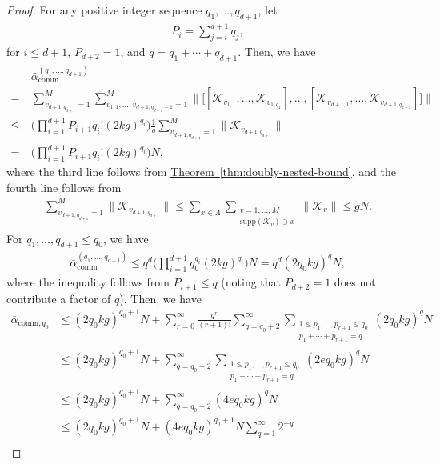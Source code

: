\documentclass[aps,pra,reprint,groupedaddress,floatfix]{revtex4-2}
\newcommand{\thm}[1]{\hyperref[thm:#1]{Theorem~\ref*{thm:#1}}}
\renewcommand{\comm}{\mathrm{comm}}
\newcommand{\supp}{\mathrm{supp}}
\newcommand{\mc}{\mathcal}
\begin{document}
\begin{proof} 
    For any positive integer sequence $q_1, \ldots, q_{d+1}$, let 
    \begin{align*}
        P_{i} = \sum_{j=i}^{d+1} q_j,
    \end{align*}
    for $i\le d+1$, $P_{d+2} = 1$, and $q = q_1+\cdots+q_{d+1}$. Then, we have 
    \begin{align*}
    &\bar{\alpha}_{\comm}^{(q_1, \ldots, q_{d+1})}\\
    =~& \sum_{v_{d+1, q_{d+1}}=1}^{M} \sum_{v_{1,1}, \ldots, v_{d+1, q_{d+1}-1} = 1}^M \bigg\| \Big[ 
         [\mc K_{v_{1,1}}, \ldots, \mc K_{v_{1,q_1}}], \ldots, 
        [\mc K_{v_{d+1,1}}, \ldots, \mc K_{v_{d+1,q_{d+1}}}]
     \Big] \bigg\| \\
    \le~& \bigg(\prod_{i=1}^{d+1}P_{i+1}q_i!(2kg)^{q_i }\bigg)\frac{1}{g}\sum_{v_{d+1, q_{d+1}}=1}^{M} \|\mc K_{v_{d+1, q_{d+1}}}\|\\
    =~&  \bigg(\prod_{i=1}^{d+1}P_{i+1}q_i!(2kg)^{q_i }\bigg)N,
\end{align*}
where the third line follows from \thm{doubly-nested-bound}, and the fourth line follows from 
\begin{align*}
    \sum_{v_{d+1,q_{d+1}}=1}^{M}\|\mc K_{v_{d+1, q_{d+1}}}\|\le \sum_{x\in\Lambda}\sum_{\substack{v = 1, \ldots, M \\ \supp(\mc K_v)\ni x}} \|\mc K_{v}\|\le gN.
\end{align*}
For $q_1, \ldots, q_{d+1}\le q_0$, we have 
\begin{align*}
    \bar{\alpha}_{\comm}^{(q_1, \ldots, q_{d+1})}\le q^{d}\bigg(\prod_{i=1}^{d+1}q_0^{q_{i}}(2kg)^{q_i }\bigg)N = q^{d} (2q_0kg)^q N,
\end{align*}
where the inequality follows from $P_{i+1}\le q$ (noting that $P_{d+2} = 1$ does not contribute a factor of $q$). 
Then, we have 
\begin{align*}
    \bar{\alpha}_{\comm,q_0} &\le (2q_0 kg)^{q_0+1} N+ \sum_{r = 0}^{\infty}\frac{q^{r} }{(r+1)!} \sum_{q=q_0+2}^{\infty}\sum_{\substack{1\le p_1, \ldots, p_{r+1}\le q_0\\p_1+\cdots+p_{r+1} = q}}(2q_0 kg)^q N \\ 
    &\le  (2q_0 kg)^{q_0+1} N+  \sum_{q=q_0+2}^{\infty}\sum_{\substack{1\le p_1, \ldots, p_{r+1}\le q_0\\p_1+\cdots+p_{r+1} = q}} (2eq_0 kg)^q N\\
    &\le(2q_0 kg)^{q_0+1} N+  \sum_{q=q_0+2}^{\infty} (4eq_0 kg)^q N   \\
    &\le (2q_0kg)^{q_0+1} N + (4eq_0 kg)^{q_0+1} N \sum_{q = 1}^{\infty} 2^{-q} \\

\end{align*}
\end{proof}
\end{document}
